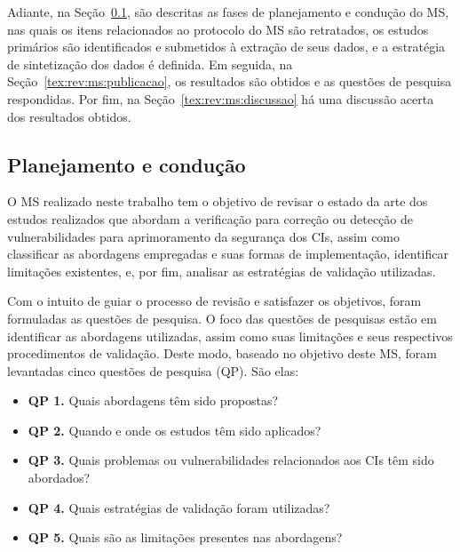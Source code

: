 Adiante, na Seção~\ref{tex:rev:ms:planejamento-cond}, são descritas as fases de planejamento e condução do MS, nas quais os itens relacionados ao protocolo do MS são retratados, os estudos primários são identificados e submetidos à extração de seus dados, e a estratégia de sintetização dos dados é definida. Em seguida, na Seção~\ref{tex:rev:ms:publicacao}, os resultados são obtidos e as questões de pesquisa respondidas. Por fim, na Seção~\ref{tex:rev:ms:discussao} há uma discussão acerta dos resultados obtidos.   

\subsection{Planejamento e condução}\label{tex:rev:ms:planejamento-cond}

O MS realizado neste trabalho tem o objetivo de revisar o estado da arte dos estudos realizados que abordam a verificação para correção ou detecção de vulnerabilidades para aprimoramento da segurança dos CIs, assim como classificar as abordagens empregadas e suas formas de implementação, identificar limitações existentes, e, por fim, analisar as estratégias de validação utilizadas.

Com o intuito de guiar o processo de revisão e satisfazer os objetivos, foram formuladas as questões de pesquisa. O foco das questões de pesquisas estão em identificar as abordagens utilizadas, assim como suas limitações e seus respectivos procedimentos de validação. Deste modo, baseado no objetivo deste MS, foram levantadas cinco questões de pesquisa (QP). São elas:

\begin{itemize}
    \item \textbf{QP 1.} Quais abordagens têm sido propostas?
    \item \textbf{QP 2.} Quando e onde os estudos têm sido aplicados?
    \item \textbf{QP 3.} Quais problemas ou vulnerabilidades relacionados aos CIs têm sido abordados?
    \item \textbf{QP 4.} Quais estratégias de validação foram utilizadas?
    \item \textbf{QP 5.} Quais são as limitações presentes nas abordagens?
\end{itemize}

